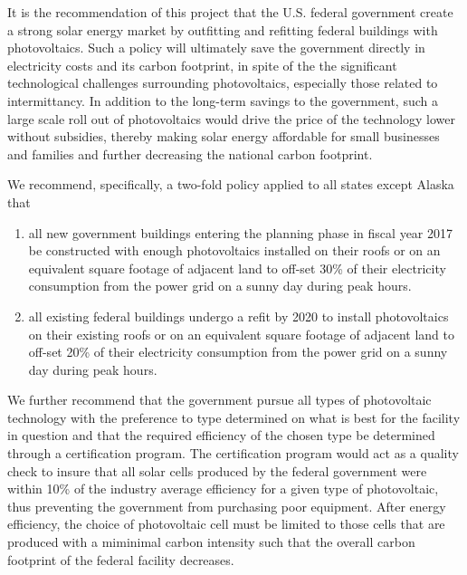 It is the recommendation of this project that the U.S. federal government 
create a strong solar energy market by outfitting and refitting federal
buildings with photovoltaics. Such a policy will ultimately save the government
directly in electricity costs and its carbon footprint, in spite of the the
significant technological challenges surrounding photovoltaics, especially
those related to intermittancy. In addition to the long-term savings to the
government, such a large scale roll out of photovoltaics would drive the price
of the technology lower without subsidies, thereby making solar energy
affordable for small businesses and families and further decreasing the
national carbon footprint.

We recommend, specifically, a two-fold policy applied to all states except
Alaska that
\begin{enumerate}
  \item all new government buildings entering the planning phase in
fiscal year 2017 be constructed with enough photovoltaics installed on their
roofs or on an equivalent square footage of adjacent land to off-set 30\% of
their electricity consumption from the power grid on a sunny day during peak
hours.
  \item all existing federal buildings undergo a refit by 2020 to install
photovoltaics on their existing roofs or on an equivalent square footage of
adjacent land to off-set 20\% of their electricity consumption from the
power grid on a sunny day during peak hours.
\end{enumerate}

We further recommend that the government pursue all types of photovoltaic
technology with the preference to type determined on what is best for the
facility in question and that the required efficiency of the chosen type be
determined through a certification program. The certification program would act
as a quality check to insure that all solar cells produced by the federal
government were within 10\% of the industry average efficiency for a given
type of photovoltaic, thus preventing the government from purchasing poor
equipment. After energy efficiency, the choice of photovoltaic cell must be
limited to those cells that are produced with a miminimal carbon intensity such
that the overall carbon footprint of the federal facility decreases.
